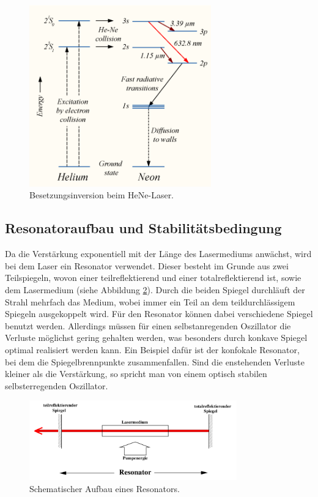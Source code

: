 \begin{figure}
  \centering
  \includegraphics[width = 0.7\textwidth]{Pics/Niveaus.png}
  \caption{Besetzungsinversion beim HeNe-Laser. \cite{Inversion}}
  \label{fig:Inversion}
\end{figure}


\subsection{Resonatoraufbau und Stabilitätsbedingung}
\label{sub:ResStab}

Da die Verstärkung exponentiell mit der Länge des Lasermediums anwächst, wird bei
dem Laser ein Resonator verwendet. Dieser besteht im Grunde aus zwei Teilspiegeln,
wovon einer teilreflektierend und einer totalreflektierend ist, sowie dem Lasermedium
(siehe Abbildung \ref{fig:Resonator}). Durch die beiden Spiegel durchläuft der Strahl
mehrfach das Medium, wobei immer ein Teil an dem teildurchlässigem Spiegeln
ausgekoppelt wird. Für den Resonator können dabei verschiedene Spiegel benutzt werden.
Allerdings müssen für einen selbstanregenden Oszillator die Verluste möglichst gering
gehalten werden, was besonders durch konkave Spiegel optimal realisiert werden kann.
Ein Beispiel dafür ist der konfokale Resonator, bei dem die Spiegelbrennpunkte zusammenfallen.
Sind die enstehenden Verluste kleiner als die Verstärkung, so spricht man von einem
optisch stabilen selbsterregenden Oszillator.

\begin{figure}
  \centering
  \includegraphics[width = 0.8\textwidth]{Pics/Resonator.png}
  \caption{Schematischer Aufbau eines Resonators. \cite{anleitung}}
  \label{fig:Resonator}
\end{figure}

